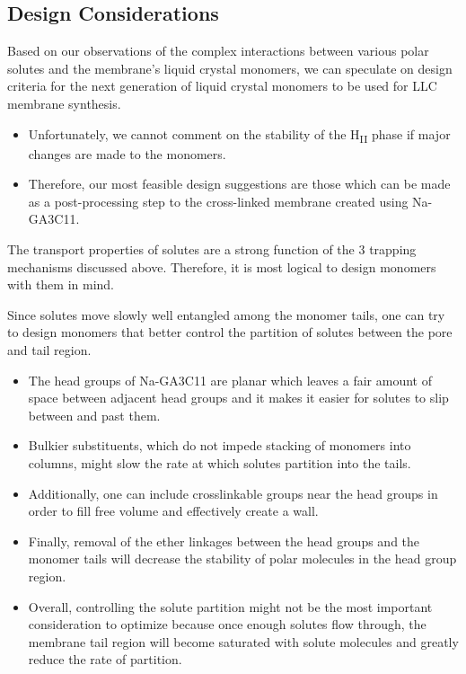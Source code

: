 \documentclass{article}
\begin{document}

  \subsection{Design Considerations}

  Based on our observations of the complex interactions between various polar solutes
  and the membrane's liquid crystal monomers, we can speculate on design criteria for 
  the next generation of liquid crystal monomers to be used for LLC membrane
  synthesis.
  \begin{itemize}
    \item Unfortunately, we cannot comment on the stability of the H\textsubscript{II}
    phase if major changes are made to the monomers.
    \item Therefore, our most feasible design suggestions are those which can be made
    as a post-processing step to the cross-linked membrane created using Na-GA3C11.
  \end{itemize}
  
  The transport properties of solutes are a strong function of the 3 trapping
  mechanisms discussed above. Therefore, it is most logical to design monomers with 
  them in mind. 
  
  Since solutes move slowly well entangled among the monomer tails, one can try to
  design monomers that better control the partition of solutes between the pore and
  tail region.
  \begin{itemize}
    \item The head groups of Na-GA3C11 are planar which leaves a fair amount of space
    between adjacent head groups and it makes it easier for solutes to slip between and
    past them.
    \item Bulkier substituents, which do not impede stacking of monomers into columns,
    might slow the rate at which solutes partition into the tails.
    \item Additionally, one can include crosslinkable groups near the head groups in
    order to fill free volume and effectively create a wall.
    \item Finally, removal of the ether linkages between the head groups and the monomer
    tails will decrease the stability of polar molecules in the head group region.
    \item Overall, controlling the solute partition might not be the most important 
    consideration to optimize because once enough solutes flow through, the membrane tail
    region will become saturated with solute molecules and greatly reduce the rate of partition.
  \end{itemize}
  
\end{document}
